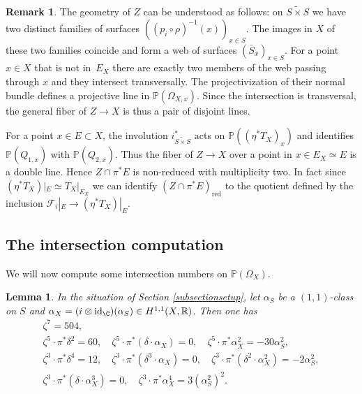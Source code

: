 \documentclass[JEP,XML,SOM,Unicode,NoEqCountersInSection,published]{cedram}
\let\mathcal\mathscr
\theoremstyle{plain}
\newtheorem{lemma}[theorem]{Lemma}
\theoremstyle{definition}
\newtheorem{remark}[theorem]{Remark}
\newcommand{\R}{\ensuremath{\mathbb{R}}}
\newcommand{\PP}{\ensuremath{\mathbb{P}}}
\newcommand{\fibre}[2]{\ensuremath{#1^{-1} (#2)}}
\newcommand\sF{{\mathcal F}}
\newcommand{\blS}{\ensuremath{\widetilde{S \times S}}}
\DeclareMathOperator{\id}{id}
\begin{document}
\begin{remark}
The geometry of $Z$ can be understood as follows: on $\blS$ we have two distinct families
of surfaces $(\fibre{(p_i \circ \rho)}{x})_{x \in S}$. The images in $X$ of these two families
coincide
and form a web of surfaces $(\bar S_x)_{x \in S}$. For a point $x \in X$ that is not in~$E_X$
there are exactly two members of the web passing through $x$ and they intersect transversally.
The projectivization of their normal bundle defines a projective line in $\PP(\Omega_{X,x})$.
Since the intersection is transversal, the general fiber of $Z \to X$ is thus a pair of disjoint
lines.

For a point $x \in E \subset X$, the involution $i_{\blS}^*$ acts on $\PP((\eta^* T_X)_x)$ and identifies
$\PP(Q_{1,x})$ with $\PP(Q_{2,x})$.
Thus the fiber of $Z \to X$ over a point in $x \in E_X \simeq E$ is a double line.
Hence $Z \cap \pi^* E$ is non-reduced with multiplicity two.
In fact since $(\eta^* T_X)|_E \simeq T_X|_{E_X}$ we can identify
$(Z \cap \pi^* E)_\mathrm{red}$ to the quotient defined by the inclusion
$\sF_i|_E \to (\eta^* T_X)|_E$.
\end{remark}

\subsection{The intersection computation} \label{subsectionnumbers}

We will now compute some intersection numbers on $\PP(\Omega_X)$.

\begin{lemma} \label{lemmanumbersX}
In the situation of Section \ref{subsectionsetup}, let $\alpha_S$ be a $(1,1)$-class on $S$
and $\alpha_X=(i \otimes \id_\C)(\alpha_S) \in H^{1,1}(X, \R)$. Then one has
\begin{gather*}
\zeta^7 = 504,
\\
\zeta^5 \cdot \pi^* \delta^2 = 60, \quad
\zeta^5 \cdot \pi^* (\delta \cdot \alpha_X) = 0, \quad
\zeta^5 \cdot \pi^* \alpha_X^2 = - 30 \alpha_S^2,
\\
\zeta^3 \cdot \pi^* \delta^4 = 12, \quad
\zeta^3 \cdot \pi^* (\delta^3 \cdot \alpha_X) = 0 , \quad
\zeta^3 \cdot \pi^* (\delta^2 \cdot \alpha_X^2) = - 2 \alpha_S^2, \\
\zeta^3 \cdot \pi^* (\delta \cdot \alpha_X^3) = 0, \quad
\zeta^3 \cdot \pi^* \alpha_X^4 = 3 (\alpha_S^2)^2.
\end{gather*}
\end{lemma}
\end{document}
